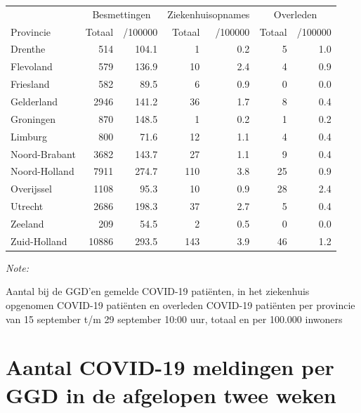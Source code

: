 \documentclass[
  english,
  man,floatsintext]{apa6}
\begin{document}
\begin{table}[H]
\centering
\begin{threeparttable}
\begin{tabular}{lrrrrrr}
\toprule
\multicolumn{1}{c}{ } & \multicolumn{2}{c}{Besmettingen} & \multicolumn{2}{c}{Ziekenhuisopnames} & \multicolumn{2}{c}{Overleden} \\
\cmidrule(l{3pt}r{3pt}){2-3} \cmidrule(l{3pt}r{3pt}){4-5} \cmidrule(l{3pt}r{3pt}){6-7}
Provincie & Totaal & /100000 & Totaal & /100000 & Totaal & /100000\\
\midrule
Drenthe & 514 & 104.1 & 1 & 0.2 & 5 & 1.0\\
Flevoland & 579 & 136.9 & 10 & 2.4 & 4 & 0.9\\
Friesland & 582 & 89.5 & 6 & 0.9 & 0 & 0.0\\
Gelderland & 2946 & 141.2 & 36 & 1.7 & 8 & 0.4\\
Groningen & 870 & 148.5 & 1 & 0.2 & 1 & 0.2\\
Limburg & 800 & 71.6 & 12 & 1.1 & 4 & 0.4\\
Noord-Brabant & 3682 & 143.7 & 27 & 1.1 & 9 & 0.4\\
Noord-Holland & 7911 & 274.7 & 110 & 3.8 & 25 & 0.9\\
Overijssel & 1108 & 95.3 & 10 & 0.9 & 28 & 2.4\\
Utrecht & 2686 & 198.3 & 37 & 2.7 & 5 & 0.4\\
Zeeland & 209 & 54.5 & 2 & 0.5 & 0 & 0.0\\
Zuid-Holland & 10886 & 293.5 & 143 & 3.9 & 46 & 1.2\\
\bottomrule
\end{tabular}
\begin{tablenotes}
\item \textit{Note: } 
\item Aantal bij de GGD’en gemelde COVID-19 patiënten, in het ziekenhuis opgenomen COVID-19 patiënten en overleden COVID-19 patiënten per provincie van 15 september t/m 29 september 10:00 uur, totaal en per 100.000 inwoners
\end{tablenotes}
\end{threeparttable}
\end{table}

\newpage

\hypertarget{aantal-covid-19-meldingen-per-ggd-in-de-afgelopen-twee-weken}{%
\section{Aantal COVID-19 meldingen per GGD in de afgelopen twee weken}\label{aantal-covid-19-meldingen-per-ggd-in-de-afgelopen-twee-weken}}
\end{document}
